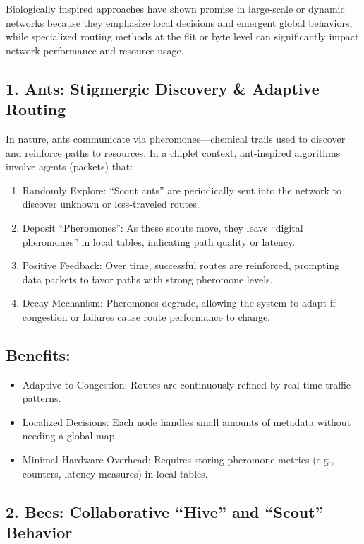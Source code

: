 \documentclass[../OAE-SPEC-MAIN.tex]{subfiles}
\begin{document}
Biologically inspired approaches have shown promise in large-scale or dynamic networks because they emphasize local decisions and emergent global behaviors, while specialized routing methods at the flit or byte level can significantly impact network performance and resource usage.

\subsection{1. Ants: Stigmergic Discovery \& Adaptive Routing}

In nature, ants communicate via pheromones—chemical trails used to discover and reinforce paths to resources. In a chiplet context, ant-inspired algorithms involve agents (packets) that:

\begin{enumerate}
\item  Randomly Explore: “Scout ants” are periodically sent into the network to discover unknown or less-traveled routes.
\item  Deposit “Pheromones”: As these scouts move, they leave “digital pheromones” in local tables, indicating path quality or latency.
\item  Positive Feedback: Over time, successful routes are reinforced, prompting data packets to favor paths with strong pheromone levels.
\item  Decay Mechanism: Pheromones degrade, allowing the system to adapt if congestion or failures cause route performance to change.
\end{enumerate}
	
\subsection{Benefits:}

\begin{itemize}
\item Adaptive to Congestion: Routes are continuously refined by real-time traffic patterns.
\item Localized Decisions: Each node handles small amounts of metadata without needing a global map.
\item Minimal Hardware Overhead: Requires storing pheromone metrics (e.g., counters, latency measures) in local tables.
\end{itemize}

\subsection{2. Bees: Collaborative “Hive” and “Scout” Behavior}
\end{document}
